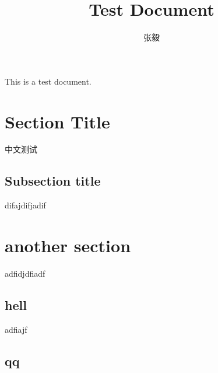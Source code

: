 \documentclass{article}
\title{Test Document}
\author{张毅}
\begin{document}
\maketitle
\tableofcontents
\newpage
This is a test document.
\section{Section Title}
中文测试
\subsection{Subsection title}
difajdifjadif
\section{another section}
adfidjdfiadf
\subsection{hell}
adfiajf
\subsection{qq}
\end{document}
